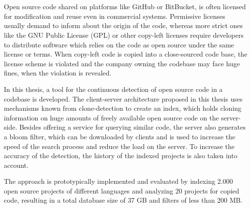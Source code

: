 \chapter{\abstractname}
Open source code shared on platforms like GitHub or BitBucket, is often licensed for modification and reuse even in commercial systems.
Permissive licenses usually demand to inform about the origin of the code, whereas more strict ones like the GNU Public License (GPL) or other copy-left licenses require developers to distribute software which relies on the code as open source under the same license or terms.
When copy-left code is copied into a close-sourced code base, the license scheme is violated and the company owning the codebase may face huge fines, when the violation is revealed.

In this thesis, a tool for the continuous detection of open source code in a codebase is developed.
The client-server architecture proposed in this thesis uses mechanisms known from clone-detection to create an index, which holds cloning information on huge amounts of freely available open source code on the server-side.
Besides offering a service for querying similar code, the server also generates a bloom filter, which can be downloaded by clients and is used to increase the speed of the search process and reduce the load on the server.
To increase the accuracy of the detection, the history of the indexed projects is also taken into account.

The approach is prototypically implemented and evaluated by indexing 2.000 open source projects of different languages and analyzing 20 projects for copied code, resulting in a total database size of 37 GB and filters of less than 200 MB.